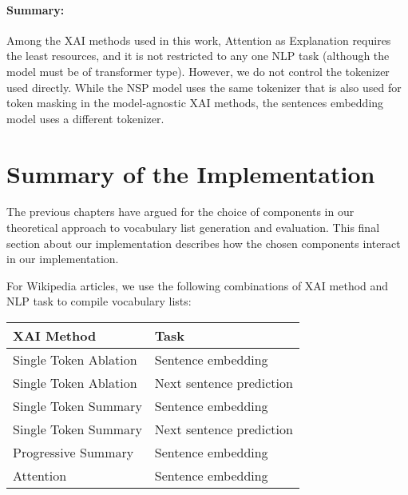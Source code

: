 \paragraph{Summary:}
Among the XAI methods used in this work, Attention as Explanation requires the least resources, and it is not restricted to any one NLP task (although the model must be of transformer type).
However, we do not control the tokenizer used directly.
While the NSP model uses the same tokenizer that is also used for token masking in the model-agnostic XAI methods, the sentences embedding model uses a different tokenizer.



%
%
\section{Summary of the Implementation} \label{sec:implementation-final}
The previous chapters have argued for the choice of components in our theoretical approach to vocabulary list generation and evaluation.
This final section about our implementation describes how the chosen components interact in our implementation.

For Wikipedia articles, we use the following combinations of XAI method and NLP task to compile vocabulary lists:

\begin{table}[H]
	\centering
	\begin{tabularx}{\textwidth}{|X|X|}
		\hline
		\textbf{XAI Method}   & \textbf{Task}            \\
		\hline
		Single Token Ablation & Sentence embedding       \\
		\hline
		Single Token Ablation & Next sentence prediction \\
		\hline
		Single Token Summary  & Sentence embedding       \\
		\hline
		Single Token Summary  & Next sentence prediction \\
		\hline
		Progressive Summary   & Sentence embedding       \\
		\hline
		Attention             & Sentence embedding       \\
		\hline
	\end{tabularx}
\end{table}

